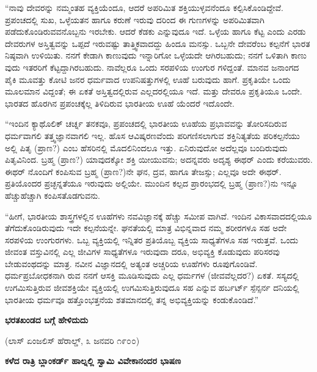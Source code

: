 “ನಾವು ದೇವರನ್ನು ನಮ್ಮಂತಹ ವ್ಯಕ್ತಿಯೆಂದೂ, ಆದರೆ ಅಪರಿಮಿತ ಶಕ್ತಿಯುಳ್ಳವನೆಂದೂ ಕಲ್ಪಿಸಿಕೊಂಡಿದ್ದೇವೆ. ಪ್ರಪಂಚದಲ್ಲಿ ಸುಖ, ಒಳ್ಳೆಯತನ ಹಾಗೂ ಕರುಣೆ ಇರುವು ದರಿಂದ ಈ ಗುಣಗಳನ್ನು ಅಪರಿಮಿತವಾಗಿ ಪಡೆದುಕೊಂಡಿರುವವನೊಬ್ಬನು ಇರಬೇಕು. ಆದರೆ ಕೆಡಕು ಎನ್ನುವುದೂ ಇದೆ. ಒಳ್ಳೆಯ ಹಾಗೂ ಕೆಟ್ಟ ಎಂದು ಎರಡು ದೇವರುಗಳ ಅಸ್ತಿತ್ವವನ್ನು ಒಪ್ಪದೆ ಇರುವಷ್ಟು ತಾತ್ತ್ವಿಕವಾದದ್ದು ಹಿಂದೂ ಮನಸ್ಸು. ಒಬ್ಬನೇ ದೇವರೆಂಬ ಕಲ್ಪನೆಗೆ ಭಾರತ ನಿಷ್ಠವಾಗಿ ಉಳಿಯಿತು. ನನಗೆ ಕೇಡಾಗಿ ಕಾಣುವುದು ಇನ್ನಾರಿಗೋ ಒಳ್ಳೆಯದೇ ಆಗಿರಬಹುದು; ನನಗೆ ಒಳಿತಾಗಿ ಕಾಣು ವುದು ಇತರರಿಗೆ ಕೆಟ್ಟದ್ದಾಗಿರಬಹುದು. ನಾವೆಲ್ಲರೂ ಒಂದು ಸರಪಳಿಯ ಉಂಗುರ ಗಳಿದ್ದಂತೆ. ಮಾನವ ಜನಾಂಗದ ಪೈಕಿ ಮೂವತ್ತು ಕೋಟಿ ಜನರ ಧರ್ಮವಾದ ಉಪನಿಷತ್ತುಗಳಲ್ಲಿ ಊಹೆ ಬರುವುದು ಹಾಗೆ. ಪ್ರಕೃತಿಯೇ ಒಂದು ಮೂಲಮಾನ ವಿದ್ದಂತೆ; ಈ ಏಕತೆ ಅಸ್ತಿತ್ವದಲ್ಲಿರುವ ಎಲ್ಲದರಲ್ಲಿಯೂ ಇದೆ. ಮತ್ತು ದೇವರೂ ಪ್ರಕೃತಿಯೂ ಒಂದೇ. ಭಾರತದ ಹೊರಗಿನ ಪ್ರಪಂಚಕ್ಕೆಲ್ಲ ತಿಳಿದಿರುವ ಭಾರತೀಯ ಊಹೆ ಯೆಂದರೆ ಇದೊಂದೇ.

“ಇಂದಿನ ಕ್ಯಾಥೊಲಿಕ್ ಚರ್ಚ್ನ ತನಕವೂ, ಪ್ರಪಂಚದಲ್ಲಿ ಭಾರತೀಯ ಊಹೆಯ ಪ್ರಭಾವವನ್ನು ತೋರಿಸದಿರುವ ಧರ್ಮವಾಗಲಿ ತತ್ತ್ವಜ್ಞಾನವಾಗಲಿ ಇಲ್ಲ. ಹೊಸ ಆವಿಷ್ಕರಣವೆಂದು ಪರಿಗಣಿಸಲಾಗುವ ಶಕ್ತಿನಿತ್ಯತೆಯ ಪರಿಕಲ್ಪನೆಯು ಅಲ್ಲಿ ಪಿತೃ (ಪ್ರಾಣ?) ಎಂಬ ಹೆಸರಿನಲ್ಲಿ ಮೊದಲಿನಿಂದಲೂ ಇತ್ತು. ಏನಿರುವುದೋ ಅದೆಲ್ಲವೂ ಬಂದಿರುವುದು ಪಿತೃವಿನಿಂದ. ಬ್ರಹ್ಮ (ಪ್ರಾಣ?) ಯಾವುದಕ್ಕೋ ಶಕ್ತಿ ಯೀಯುವನು; ಅದನ್ನವರು ಅದೃಶ್ಯ ಈಥರ್ ಎಂದು ಕರೆಯುವರು. ಈಥರ್ ನೊಂದಿಗೆ ಕಂಪಿಸುವ ಬ್ರಹ್ಮ (ಪ್ರಾಣ?)ನೇ ಘನ, ದ್ರವ, ಹಾಗೂ ತೇಜಸ್ಸು; ಎಲ್ಲವೂ ಅದೇ ಈಥರ್. ಪ್ರತಿಯೊಂದರ ಪ್ರಚ್ಛನ್ನತೆಯೂ ಇರುವುದು ಅಲ್ಲಿಯೇ. ಮುಂದಿನ ಕಲ್ಪದ ಪ್ರಾರಂಭದಲ್ಲಿ ಬ್ರಹ್ಮ (ಪ್ರಾಣ?)ನು ಇನ್ನೂ ಹೆಚ್ಚುಹೆಚ್ಚಾಗಿ ಕಂಪಿಸತೊಡಗುವನು.

“ಹೀಗೆ, ಭಾರತೀಯ ಶಾಸ್ತ್ರಗಳಲ್ಲಿನ ಊಹೆಗಳು ನವವಿಜ್ಞಾನಕ್ಕೆ ಹೆಚ್ಚು ಸಮೀಪ ವಾಗಿವೆ. ಇಂದಿನ ವಿಕಾಸವಾದದಲ್ಲಿಯೂ ತೆಗೆದುಕೊಂಡಿರುವುದು ಇದೇ ಕಲ್ಪನೆಯನ್ನೇ. ಘನತೆಯಲ್ಲಿ ಮಾತ್ರ ವಿಭಿನ್ನವಾದ ನಮ್ಮ ಶರೀರಗಳೂ ಸಹ ಅದೇ ಸರಪಳಿಯ ಉಂಗುರಗಳು. ಒಬ್ಬ ವ್ಯಕ್ತಿಯಲ್ಲಿ ಇನ್ನಿತರ ಪ್ರತಿಯೊಬ್ಬ ವ್ಯಕ್ತಿಯ ಸಾಧ್ಯತೆಗಳೂ ಸಹ ಇರುತ್ತವೆ. ಒಂದು ಜೀವಂತ ವಸ್ತುವಿನಲ್ಲಿ ಎಲ್ಲ ಜೀವಿಗಳ ಸಾಧ್ಯತೆಗಳೂ ಇರುವುದಾ ದರೂ, ಅಭಿವ್ಯಕ್ತಿ ಕೊಡುವುದು ಪರಿಸರವು ಬೇಡುವಂಥದನ್ನು ಮಾತ್ರ. ನವೀನ ವಿಜ್ಞಾನದಲ್ಲಿ ಅತ್ಯಂತ ಅಚ್ಚರಿಯ ಊಹೆಗಳು ರೂಪುಗೊಂಡಿವೆ. ಧರ್ಮಪ್ರಬೋಧಕನಾಗಿ ರುವ ನನಗೆ ಆಸಕ್ತಿ ಮೂಡಿಸುವುದು ಎಲ್ಲ ಧರ್ಮಗಳ (ಜೀವವೆಲ್ಲದರ?) ಏಕತೆ. ಸಸ್ಯದಲ್ಲಿ ಉಗಮಿಸುತ್ತಿರುವ ಜೀವಶಕ್ತಿಯೇ ವ್ಯಕ್ತಿಯಲ್ಲಿ ಉಗಮಿಸುತ್ತಿರುವುದೂ ಸಹ ಎನ್ನುವ ಹರ್ಬರ್ಟ್ ಸ್ಪೆನ್ಸರ್ನ ದನಿಯಲ್ಲಿ ಭಾರತೀಯ ಧರ್ಮವೂ ಹತ್ತೊಂಭತ್ತನೆಯ ಶತಮಾನದಲ್ಲಿ ತನ್ನ ಅಭಿವ್ಯಕ್ತಿಯನ್ನು ಕಂಡುಕೊಂಡಿದೆ.”

\begin{center}
\textbf{ಭರತಖಂಡದ ಬಗ್ಗೆ ಹೇಳಿದುದು}
\end{center}

\begin{center}
(ಲಾಸ್ ಏಂಜಲಿಸ್ ಹೆರಾಲ್ಡ್, ೩ ಜನವರಿ ೧೯೦೦)
\end{center}

\begin{center}
\textbf{ಕಳೆದ ರಾತ್ರಿ ಬ್ಲಾಂಕರ್ಡ್ ಹಾಲ್ನಲ್ಲಿ ಸ್ವಾಮಿ ವಿವೇಕಾನಂದರ ಭಾಷಣ}
\end{center}

